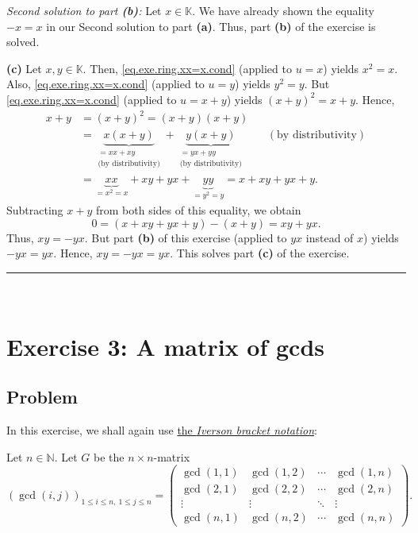 \documentclass[paper=a4, fontsize=12pt]{scrartcl}%
\theoremstyle{plainsl}
\theoremstyle{definition}
\theoremstyle{remark}
\begin{document}
\textit{Second solution to part \textbf{(b)}:} Let $x\in\mathbb{K}$. We have
already shown the equality $-x=x$ in our Second solution to part \textbf{(a)}.
Thus, part \textbf{(b)} of the exercise is solved.

\bigskip

\textbf{(c)} Let $x,y\in\mathbb{K}$. Then, \eqref{eq.exe.ring.xx=x.cond}
(applied to $u=x$) yields $x^{2}=x$. Also, \eqref{eq.exe.ring.xx=x.cond}
(applied to $u=y$) yields $y^{2}=y$. But \eqref{eq.exe.ring.xx=x.cond}
(applied to $u=x+y$) yields $\left(  x+y\right)  ^{2}=x+y$. Hence,%
\begin{align*}
x+y  &  =\left(  x+y\right)  ^{2}=\left(  x+y\right)  \left(  x+y\right) \\
&  =\underbrace{x\left(  x+y\right)  }_{\substack{=xx+xy\\\text{(by
distributivity)}}}+\underbrace{y\left(  x+y\right)  }%
_{\substack{=yx+yy\\\text{(by distributivity)}}}\qquad\left(  \text{by
distributivity}\right) \\
&  =\underbrace{xx}_{=x^{2}=x}+xy+yx+\underbrace{yy}_{=y^{2}=y}=x+xy+yx+y.
\end{align*}
Subtracting $x+y$ from both sides of this equality, we obtain%
\[
0=\left(  x+xy+yx+y\right)  -\left(  x+y\right)  =xy+yx.
\]
Thus, $xy=-yx$. But part \textbf{(b)} of this exercise (applied to $yx$
instead of $x$) yields $-yx=yx$. Hence, $xy=-yx=yx$. This solves part
\textbf{(c)} of the exercise.

\rule{\linewidth}{0.3pt} \\[0.4cm]

\section{Exercise 3: A matrix of gcds}

\subsection{Problem}

In this exercise, we shall again use
\href{https://en.wikipedia.org/wiki/Iverson_bracket}{the \textit{Iverson
bracket notation}}:

Let $n \in\mathbb{N}$. Let $G$ be the $n \times n$-matrix
\[
\left(  \gcd\left(  i, j \right)  \right)  _{1 \leq i \leq n, \ 1 \leq j \leq
n } =
\begin{pmatrix}
\gcd\left(  1, 1 \right)  & \gcd\left(  1, 2 \right)  & \cdots & \gcd\left(
1, n \right) \\
\gcd\left(  2, 1 \right)  & \gcd\left(  2, 2 \right)  & \cdots & \gcd\left(
2, n \right) \\
\vdots & \vdots & \ddots & \vdots\\
\gcd\left(  n, 1 \right)  & \gcd\left(  n, 2 \right)  & \cdots & \gcd\left(
n, n \right)
\end{pmatrix}
.
\]
\end{document}
